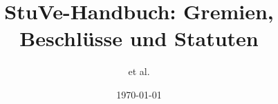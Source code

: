 



\title{StuVe-Handbuch: Gremien, Beschl\"usse und Statuten}
\date{\today}
\author{et al.}



\usepackage[utf8]{inputenc}
\usepackage[T1]{fontenc}					%
\usepackage{lmodern}						%
\renewcommand{\familydefault}{\sfdefault}
\usepackage[ngerman]{babel}					%
\usepackage{setspace}
\usepackage{tipa}							%



\setlength{\parindent}{0pt}        %



\usepackage{perpage}

\usepackage[left=2.2cm, right=2cm, top=1cm, bottom=1cm]{geometry}



\usepackage{layout}							%
\usepackage{totcount}						%

\usepackage[final]{pdfpages}
\usepackage{graphicx}


